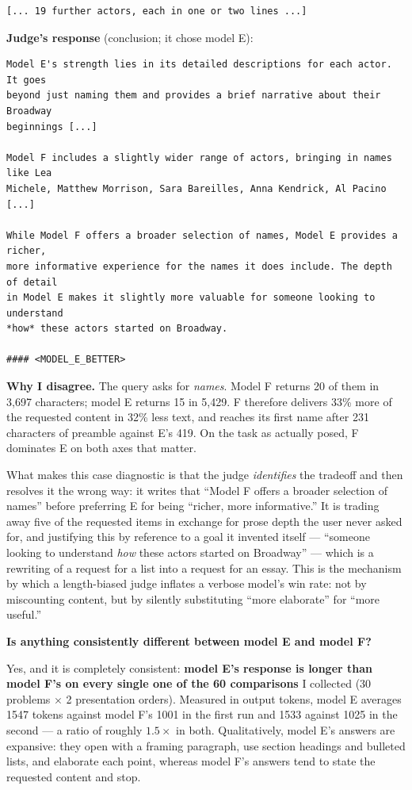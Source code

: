 \begin{answer}
\begin{lstlisting}[language={},numbers=none,basicstyle=\footnotesize\ttfamily,frame=single]
    [... 19 further actors, each in one or two lines ...]
\end{lstlisting}

\textbf{Judge's response} (conclusion; it chose model E):

\begin{lstlisting}[language={},numbers=none,basicstyle=\footnotesize\ttfamily,frame=single]
Model E's strength lies in its detailed descriptions for each actor. It goes
beyond just naming them and provides a brief narrative about their Broadway
beginnings [...]

Model F includes a slightly wider range of actors, bringing in names like Lea
Michele, Matthew Morrison, Sara Bareilles, Anna Kendrick, Al Pacino [...]

While Model F offers a broader selection of names, Model E provides a richer,
more informative experience for the names it does include. The depth of detail
in Model E makes it slightly more valuable for someone looking to understand
*how* these actors started on Broadway.

#### <MODEL_E_BETTER>
\end{lstlisting}

\textbf{Why I disagree.} The query asks for \emph{names}. Model F returns 20 of
them in 3{,}697 characters; model E returns 15 in 5{,}429. F therefore delivers
33\% more of the requested content in 32\% less text, and reaches its first name
after 231 characters of preamble against E's 419. On the task as actually posed,
F dominates E on both axes that matter.

What makes this case diagnostic is that the judge \emph{identifies} the tradeoff
and then resolves it the wrong way: it writes that ``Model F offers a broader
selection of names'' before preferring E for being ``richer, more informative.''
It is trading away five of the requested items in exchange for prose depth the
user never asked for, and justifying this by reference to a goal it invented
itself --- ``someone looking to understand \emph{how} these actors started on
Broadway'' --- which is a rewriting of a request for a list into a request for an
essay. This is the mechanism by which a length-biased judge inflates a verbose
model's win rate: not by miscounting content, but by silently substituting
``more elaborate'' for ``more useful.''

\textbf{Is anything consistently different between model E and model F?}

Yes, and it is completely consistent: \textbf{model E's response is longer than
model F's on every single one of the 60 comparisons} I collected (30 problems
$\times$ 2 presentation orders). Measured in output tokens, model E averages
1547 tokens against model F's 1001 in the first run and 1533 against 1025 in the
second --- a ratio of roughly $1.5\times$ in both. Qualitatively, model E's
answers are expansive: they open with a framing paragraph, use section headings
and bulleted lists, and elaborate each point, whereas model F's answers tend to
state the requested content and stop.


\end{answer}
